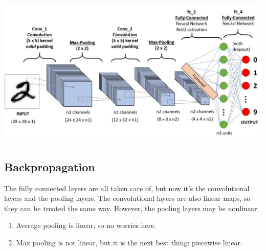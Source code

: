   \begin{center}
    \includegraphics[scale=0.25]{img/CNN_architecture.jpeg}
  \end{center}

\subsection{Backpropagation}

  The fully connected layers are all taken care of, but now it's the convolutional layers and the pooling layers. The convolutional layers are also linear maps, so they can be treated the same way. However, the pooling layers may be nonlinear. 
  \begin{enumerate}
    \item Average pooling is linear, so no worries here. 
    \item Max pooling is not linear, but it is the next best thing: piecewise linear. 
  \end{enumerate}

